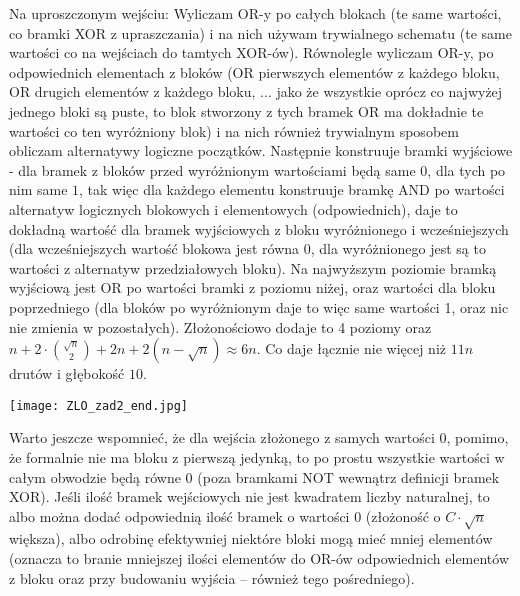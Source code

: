 \documentclass{article}
\begin{document}
Na uproszczonym wejściu:\newline
Wyliczam OR-y po całych blokach (te same wartości, co bramki XOR z upraszczania) i na nich używam trywialnego schematu
(te same wartości co na wejściach do tamtych XOR-ów).\newline
Równolegle wyliczam OR-y, po odpowiednich elementach z bloków
(OR pierwszych elementów z każdego bloku, OR drugich elementów z każdego bloku, ... 
jako że wszystkie oprócz co najwyżej jednego bloki są puste, to blok stworzony z tych bramek OR ma dokładnie te wartości co ten wyróżniony blok)
i na nich również trywialnym sposobem obliczam alternatywy logiczne początków.\newline
Następnie konstruuje bramki wyjściowe - dla bramek z bloków przed wyróżnionym wartościami będą same $0$, dla tych po nim same $1$,
tak więc dla każdego elementu konstruuje bramkę AND po wartości alternatyw logicznych blokowych i elementowych (odpowiednich),
daje to dokładną wartość dla bramek wyjściowych z bloku wyróżnionego i wcześniejszych (dla wcześniejszych wartość blokowa jest równa 0,
dla wyróżnionego jest są to wartości z alternatyw przedziałowych bloku).\newline
Na najwyższym poziomie bramką wyjściową jest OR po wartości bramki
z poziomu niżej, oraz wartości dla bloku poprzedniego (dla bloków po wyróżnionym daje to więc same wartości 1, oraz nic nie zmienia w pozostałych).
Złożonościowo dodaje to 4 poziomy oraz $n+2\cdot{\sqrt{n}\choose2}+2n+2(n-\sqrt{n})\approx6n$.
Co daje łącznie nie więcej niż $11n$ drutów i głębokość $10$.
\begin{center}\texttt{[image: ZLO\_zad2\_end.jpg]}\end{center}
Warto jeszcze wspomnieć, że dla wejścia złożonego z samych wartości 0, pomimo, że formalnie nie ma bloku z pierwszą jedynką,
to po prostu wszystkie wartości w całym obwodzie będą równe 0 (poza bramkami NOT wewnątrz definicji bramek XOR).\newline
Jeśli ilość bramek wejściowych nie jest kwadratem liczby naturalnej, to albo można dodać odpowiednią ilość bramek o wartości 0
(złożoność o $C\cdot\sqrt{n}$ większa), albo odrobinę efektywniej niektóre bloki mogą mieć mniej elementów
(oznacza to branie mniejszej ilości elementów do OR-ów odpowiednich elementów z bloku oraz przy budowaniu wyjścia -- również tego pośredniego).
\end{document}
